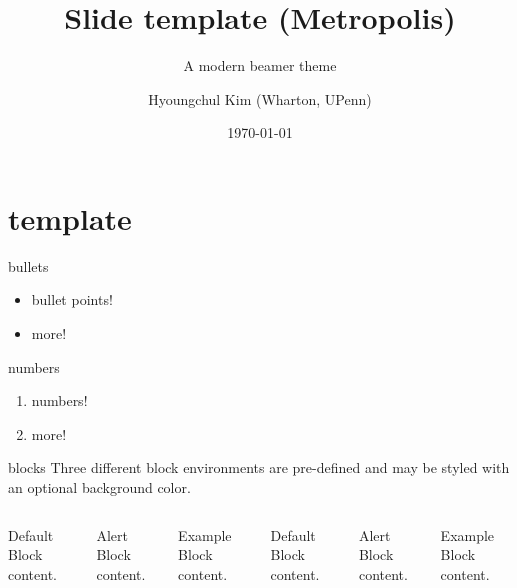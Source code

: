 \documentclass[aspectratio=169]{beamer}
\title{Slide template (Metropolis)}
\subtitle{A modern beamer theme}
\date{\today}
\author{Hyoungchul Kim (Wharton, UPenn)}
\begin{document}
\maketitle

\section[template]{template}

\begin{frame}{bullets}
	\begin{itemize}
		\item bullet points!
		\item more!
	\end{itemize}
\end{frame}

\begin{frame}{numbers}
	\begin{enumerate}
		\item numbers!
		\item more!
	\end{enumerate}	
\end{frame}

\begin{frame}{blocks}
  Three different block environments are pre-defined and may be styled with an
  optional background color.

  \begin{columns}[T,onlytextwidth]
      \begin{block}{Default}
        Block content.
      \end{block}

      \begin{alertblock}{Alert}
        Block content.
      \end{alertblock}

      \begin{exampleblock}{Example}
        Block content.
      \end{exampleblock}



      \begin{block}{Default}
        Block content.
      \end{block}

      \begin{alertblock}{Alert}
        Block content.
      \end{alertblock}

      \begin{exampleblock}{Example}
        Block content.
      \end{exampleblock}

  \end{columns}
\end{frame}
\end{document}
